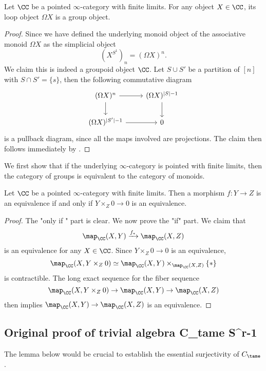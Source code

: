 \begin{lemma}
\label{loop objects are grouplike monoid objects}
	Let $\CC$ be a pointed $\infty$-category with finite limits. For any object $X\in \CC$, its loop object $\Omega X$ is a group object.
\end{lemma}
\begin{proof}
	Since we have defined the underlying monoid object of the associative monoid $\Omega X$ as the simplicial object
	$$
	(X^{S^1})_n=(\Omega X)^{n}.
	$$
	We claim this is indeed a groupoid object $\CC$.
    Let $S\cup S'$ be a partition of $[n]$ with $S\cap S'=\{s\}$, then the following commutative diagram
    \[
\begin{tikzcd}
	(\Omega X)^{ n} & (\Omega X)^{|S|-1} \\
	(\Omega X)^{ |S'|-1}   &  0
	\arrow[from=1-1, to= 1-2]
	\arrow[from=1-1, to=2-1]
	\arrow[from=1-2, to=2-2]
	\arrow[from=2-1, to= 2-2]
\end{tikzcd}
    \]
	is a pullback diagram, since all the maps involved are projections.
	The claim then follows immediately by \cite[Remark 5.2.6.5.]{HA}.
\end{proof}


We first show that if the underlying $\infty$-category is pointed with finite limits, then the category of groups is equivalent to the category of monoids.
\begin{lemma}
    Let $\CC$ be a pointed $\infty$-category with finite limits.
    Then a morphism $f:Y \to Z$ is an equivalence if and only if $Y\times_Z 0\to 0$ is an equivalence.
\end{lemma}
\begin{proof}
    The "only if " part is clear. 
    We now prove the "if" part. We claim that
    $$
    \map_{\CC}(X, Y)
    \xrightarrow{f_*}
    \map_{\CC}(X, Z)
    $$
    is an equivalence for any $X\in \CC$. Since $Y\times_Z 0\to 0$ is an equivalence, 
    $$
    \map_{\CC}(X,Y\times_Z 0) 
    \simeq
    \map_{\CC}(X,Y) \times_{\map_{\CC}(X,Z)} \{*\} 
    $$
     is contractible. The long exact sequence for the fiber sequence 
    $$
    \map_{\CC}(X,Y\times_Z 0)  \to \map_{\CC}(X, Y ) \to \map_{\CC}(X, Z)
    $$
    then implies $\map_{\CC}(X, Y ) \to \map_{\CC}(X, Z)$ is an equivalence.
    
\end{proof}


\subsection{Original proof of trivial algebra C_tame S^{r-1}}
The lemma below would be crucial to establish the essential surjectivity of $C_{\tame}$.

